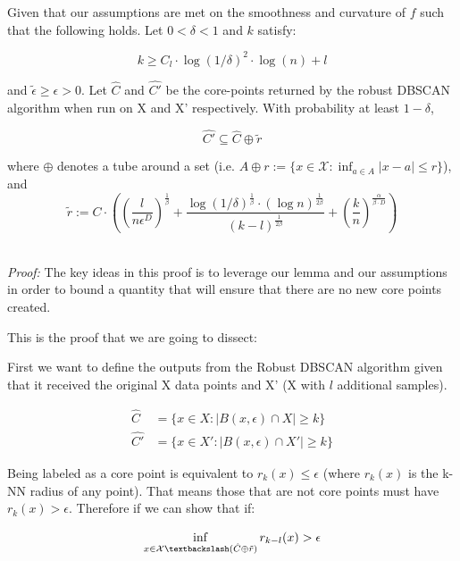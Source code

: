 \begin{theorem}
Given that our assumptions are met on the smoothness and curvature of $f$ such that the following holds. Let $0<\delta<1$ and $k$ satisfy:

\begin{equation*}
    k\geq C_l\cdot\log(1/\delta)^2\cdot\log(n) + l
\end{equation*}

and $\tilde{\epsilon}\geq\epsilon>0$. Let $\hat{C}$ and $\hat{C'}$ be the core-points returned by the robust DBSCAN algorithm when run on X and X' respectively. With probability at least $1-\delta$,

\begin{equation*}
    \hat{C'}\subseteq \hat{C}\oplus\tilde{r}
\end{equation*}

where $\oplus$ denotes a tube around a set (i.e. $A \oplus r := \{x\in\mathcal{X}: \inf_{a\in A}|x-a|\leq r\}$), and
\begin{equation*}
    \tilde{r}:=C\cdot\left(\left(\frac{l}{n\epsilon^D}\right)^{\frac{1}{\beta}} + \frac{\log(1/\delta)^{\frac{1}{\beta}}\cdot(\log n)^\frac{1}{2\beta}}{(k-l)^{\frac{1}{2\beta}}} + \left(\frac{k}{n}\right)^{\frac{\alpha}{\beta\cdot D}}\right)
\end{equation*}
\end{theorem}\\

\textit{Proof:} The key ideas in this proof is to leverage our lemma and our assumptions in order to bound a quantity that will ensure that there are no new core points created.

This is the proof that we are going to dissect:

First we want to define the outputs from the Robust DBSCAN algorithm given that it received the original X data points and X' (X with $l$ additional samples).

\begin{align*}
\hat{C} &= \{x \in X: |B(x,\epsilon) \cap X|\geq k \}\\
\hat{C'} &= \{x \in X': |B(x,\epsilon) \cap X'|\geq k \}
\end{align*}

Being labeled as a core point is equivalent to $r_k(x) \leq\epsilon$ (where $r_k(x)$ is the k-NN radius of any point). That means those that are not core points must have $r_k(x) > \epsilon$. Therefore if we can show that if:

\begin{equation*}
    \inf\limits_{x\in\mathcal{X} \textbackslash (\hat{C}\oplus\tilde{r})} r_{k-l}(x)>\epsilon
\end{equation*}

